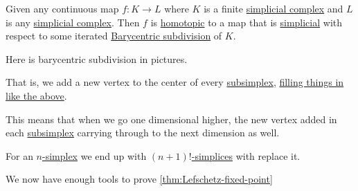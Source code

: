 \begin{theorem}\label{thm:simplicial-approximation-theorem}
	Given any continuous map \(f \colon K \to L\) where \(K\) is a finite \hyperref[def:simplicial-complex]{simplicial complex} and
	\(L\) is any \hyperref[def:simplicial-complex]{simplicial complex}. Then \(f\) is \hyperref[def:homotopic]{homotopic} to a map
	that is \hyperref[def:simplicial-map]{simplicial} with respect to some iterated \hyperref[eg:Barycentric-subdivision]{Barycentric subdivision} of \(K\).
\end{theorem}
\begin{eg}\label{eg:Barycentric-subdivision}
	Here is barycentric subdivision in pictures.
	\begin{figure}[H]
		\centering
		\label{fig:eg:barycentric-subdivision}
	\end{figure}
	That is, we add a new vertex to the center of every \hyperref[def:subsimplex]{subsimplex}, \underline{filling things in like the above}.
	\begin{note}
		This means that when we go one dimensional higher, the new vertex added in each \hyperref[def:subsimplex]{subsimplex} carrying through to the next
		dimension as well.
	\end{note}

	For an \hyperref[def:standard-simplex]{\(n\)-simplex} we end up with \hyperref[def:standard-simplex]{\((n + 1)!\)-simplices} with replace it.

\end{eg}

We now have enough tools to prove \autoref{thm:Lefschetz-fixed-point}

